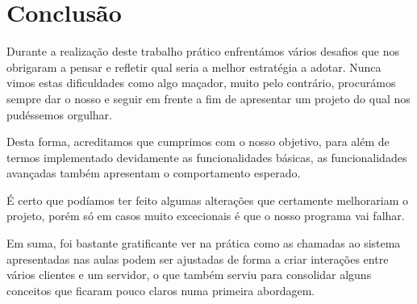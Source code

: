 \documentclass[12pt,a4paper]{report}
\begin{document}
\chapter{Conclusão}

    Durante a realização deste trabalho prático enfrentámos vários desafios que nos obrigaram a pensar e refletir qual seria a melhor estratégia a adotar. Nunca vimos estas dificuldades como algo maçador, muito pelo contrário, procurámos sempre dar o nosso e seguir em frente a fim de apresentar um projeto do qual nos pudéssemos orgulhar.

    Desta forma, acreditamos que cumprimos com o nosso objetivo, para além de termos implementado devidamente as funcionalidades básicas, as funcionalidades avançadas também apresentam o comportamento esperado.

    É certo que podíamos ter feito algumas alterações que certamente melhorariam o projeto, porém só em casos muito excecionais é que o nosso programa vai falhar.

    Em suma, foi bastante gratificante ver na prática como as chamadas ao sistema apresentadas nas aulas podem ser ajustadas de forma a criar interações entre vários clientes e um servidor, o que também serviu para consolidar alguns conceitos que ficaram pouco claros numa primeira abordagem.
\end{document}
